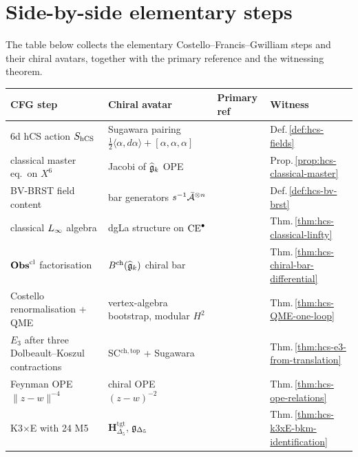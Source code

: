 \section{Side-by-side elementary steps}
\label{sec:hcs-side-by-side}

The table below collects the elementary
Costello--Francis--Gwilliam steps and their chiral avatars, together
with the primary reference and the witnessing theorem.

{\small
\begin{center}
\begin{tabular}{p{3cm}p{3cm}p{3cm}p{3cm}}
 \toprule
 CFG step & Chiral avatar & Primary ref & Witness \\
 \midrule
 6d hCS action $S_{\mathrm{hCS}}$
 & Sugawara pairing $\tfrac{1}{2}\langle\alpha,d\alpha\rangle+[\alpha,\alpha,\alpha]$
 & \cite{CostelloYangian}
 & Def.\,\ref{def:hcs-fields} \\
 classical master eq.\ on $X^6$
 & Jacobi of $\widehat{\mathfrak{g}}_k$ OPE
 & \cite{CostelloGwilliam2017}
 & Prop.\,\ref{prop:hcs-classical-master} \\
 BV-BRST field content
 & bar generators $s^{-1}\bar{\mathcal{A}}^{\otimes n}$
 & \cite{CG17}
 & Def.\,\ref{def:hcs-bv-brst} \\
 classical $L_\infty$ algebra
 & dgLa structure on $\mathrm{CE}^\bullet$
 & \cite{CostelloGwilliam2017}
 & Thm.\,\ref{thm:hcs-classical-linfty} \\
 $\mathbf{Obs}^{\mathrm{cl}}$ factorisation
 & $B^{\mathrm{ch}}(\widehat{\mathfrak{g}}_k)$ chiral bar
 & \cite{BD04}
 & Thm.\,\ref{thm:hcs-chiral-bar-differential} \\
 Costello renormalisation + QME
 & vertex-algebra bootstrap, modular $H^2$
 & \cite{CostelloRenormalization}
 & Thm.\,\ref{thm:hcs-QME-one-loop} \\
 $E_3$ after three Dolbeault--Koszul contractions
 & SC$^{\mathrm{ch,top}}$ + Sugawara
 & \cite{LurieHA}
 & Thm.\,\ref{thm:hcs-e3-from-translation} \\
 Feynman OPE $\|z-w\|^{-4}$
 & chiral OPE $(z-w)^{-2}$
 & \cite{CostelloRenormalization}
 & Thm.\,\ref{thm:hcs-ope-relations} \\
 K3$\times$E with 24 M5
 & $\mathbf{H}_{\Delta_5}^{\mathrm{tgt}}$, $\mathfrak{g}_{\Delta_5}$
 & \cite{Gaiotto2009,Borcherds98}
 & Thm.\,\ref{thm:hcs-k3xE-bkm-identification} \\
 \bottomrule
\end{tabular}
\end{center}
}

